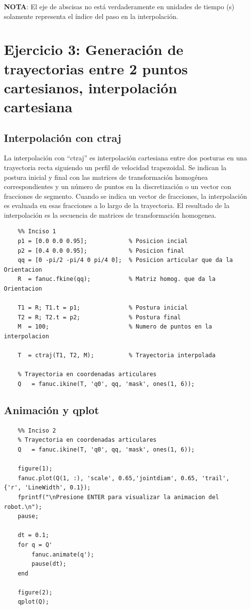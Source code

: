 \documentclass[a4paper,12pt]{article}
\begin{document}
\textbf{NOTA}: El eje de abscisas no está verdaderamente en unidades de tiempo (s)
solamente representa el índice del paso en la interpolación.

\section{Ejercicio 3:  Generación de trayectorias entre 2 puntos cartesianos, interpolación cartesiana}
\subsection{Interpolación con ctraj}
La interpolación con ``ctraj'' es interpolación cartesiana entre dos posturas en una trayectoria recta siguiendo un perfil de velocidad trapezoidal.
Se indican la postura inicial y final con las matrices de transformación homogénea correspondientes y un número de puntos
en la discretización o un vector con fracciones de segmento.
Cuando se indica un vector de fracciones, la interpolación es evaluada 
en esas fracciones a lo largo de la trayectoria.
El resultado de la interpolación es la secuencia de matrices de transformación homogenea.

\begin{lstlisting}
    %% Inciso 1
    p1 = [0.0 0.0 0.95];            % Posicion incial
    p2 = [0.4 0.0 0.95];            % Posicion final
    qq = [0 -pi/2 -pi/4 0 pi/4 0];  % Posicion articular que da la Orientacion
    R  = fanuc.fkine(qq);           % Matriz homog. que da la Orientacion

    T1 = R; T1.t = p1;              % Postura inicial
    T2 = R; T2.t = p2;              % Postura final
    M  = 100;                       % Numero de puntos en la interpolacion

    T  = ctraj(T1, T2, M);          % Trayectoria interpolada

    % Trayectoria en coordenadas articulares
    Q   = fanuc.ikine(T, 'q0', qq, 'mask', ones(1, 6));
\end{lstlisting}

\subsection{Animación y qplot}
\begin{lstlisting}
    %% Inciso 2
    % Trayectoria en coordenadas articulares
    Q   = fanuc.ikine(T, 'q0', qq, 'mask', ones(1, 6));

    figure(1);
    fanuc.plot(Q(1, :), 'scale', 0.65,'jointdiam', 0.65, 'trail', {'r', 'LineWidth', 0.1});
    fprintf("\nPresione ENTER para visualizar la animacion del robot.\n");
    pause;

    dt = 0.1;
    for q = Q'
        fanuc.animate(q');
        pause(dt);
    end

    figure(2);
    qplot(Q);
\end{lstlisting}
\end{document}
